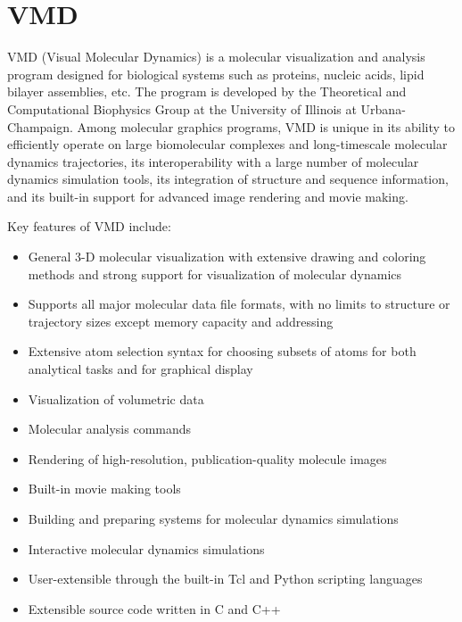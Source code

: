 \section{VMD}
VMD (Visual Molecular Dynamics) is a molecular visualization and analysis program designed for biological systems such as proteins, nucleic acids, lipid bilayer assemblies, etc. The program is developed by the Theoretical and Computational Biophysics Group at the University of Illinois at Urbana-Champaign. Among molecular graphics programs, VMD is unique in its ability to efficiently operate on large biomolecular complexes and long-timescale molecular dynamics trajectories, its interoperability with a large number of molecular dynamics simulation tools, its integration of structure and sequence information, and its built-in support for advanced image rendering and movie making.

Key features of VMD include:
\begin{itemize}
\item General 3-D molecular visualization with extensive drawing and coloring methods and strong support for visualization of molecular dynamics
\item Supports all major molecular data file formats, with no limits to structure or trajectory sizes except memory capacity and addressing
\item Extensive atom selection syntax for choosing subsets of atoms for both analytical tasks and for graphical display
\item Visualization of volumetric data
\item Molecular analysis commands
\item Rendering of high-resolution, publication-quality molecule images
\item Built-in movie making tools
\item Building and preparing systems for molecular dynamics simulations
\item Interactive molecular dynamics simulations
\item User-extensible through the built-in Tcl and Python scripting languages
\item Extensible source code written in C and C++
\end{itemize}

